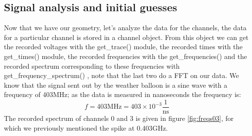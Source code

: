 \subsection{Signal analysis and initial guesses}
Now that we have our geometry, let's analyze the data for the channels,
the data for a particular channel is stored in a channel object. From this
object we can get the recorded voltages with the get\_trace() module, the
recorded times with the get\_times() module, the recorded frequencies with the
get\_frequencies() and the recorded spectrum corresponding to these frequencies
with get\_frequency\_spectrum() , note that the last two do a FFT on our data.
We know that the signal sent out by the weather balloon is a sine wave with a
frequency of 403MHz; as the data is measured in nanoseconds the frequency is:
\begin{equation}
	f = 403\text{MHz} = 403\times 10^{-3} \frac{1}{\text{ns}}
\end{equation}
The recorded spectrum of channels 0 and 3 is given in figure \ref{fig:freqs03}, for 
which we previously mentioned the spike at 0.403GHz.
